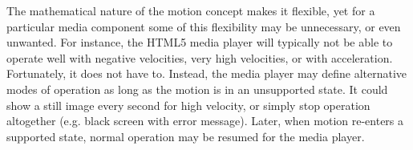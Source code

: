 \label{sec:toomuch}

The mathematical nature of the motion concept makes it flexible, yet for a
particular media component some of this flexibility may be unnecessary, or
even unwanted. For instance, the HTML5 media player will typically not be able
to operate well with negative velocities, very high velocities, or with
acceleration. Fortunately, it does not have to. Instead, the media player may
define alternative modes of operation as long as the motion is in an
unsupported state. It could show a still image every second for high velocity,
or simply stop operation altogether (e.g. black screen with error message).
Later, when motion re-enters a supported state, normal operation may be
resumed for the media player.

